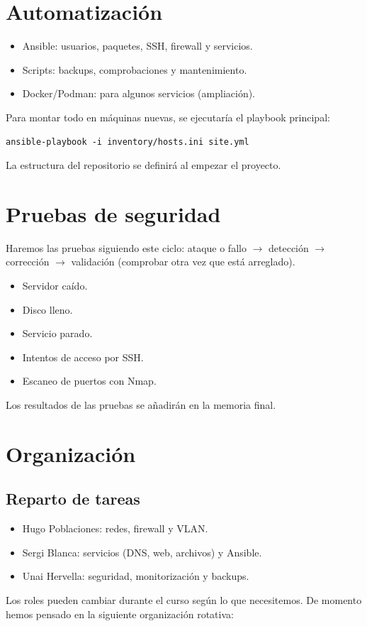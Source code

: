 \documentclass[12pt,a4paper]{article}
\begin{document}
\section{Automatización}
\begin{itemize}
\item Ansible: usuarios, paquetes, SSH, firewall y servicios.
\item Scripts: backups, comprobaciones y mantenimiento.
\item Docker/Podman: para algunos servicios (ampliación).
\end{itemize}
Para montar todo en máquinas nuevas, se ejecutaría el playbook principal:
\begin{verbatim}
ansible-playbook -i inventory/hosts.ini site.yml
\end{verbatim}
La estructura del repositorio se definirá al empezar el proyecto.

\section{Pruebas de seguridad}
Haremos las pruebas siguiendo este ciclo: ataque o fallo $\rightarrow$ detección $\rightarrow$ corrección $\rightarrow$ validación (comprobar otra vez que está arreglado).
\begin{itemize}
\item Servidor caído.
\item Disco lleno.
\item Servicio parado.
\item Intentos de acceso por SSH.
\item Escaneo de puertos con Nmap.
\end{itemize}
Los resultados de las pruebas se añadirán en la memoria final.

\section{Organización}
\subsection{Reparto de tareas}
\begin{itemize}
\item Hugo Poblaciones: redes, firewall y VLAN.
\item Sergi Blanca: servicios (DNS, web, archivos) y Ansible.
\item Unai Hervella: seguridad, monitorización y backups.
\end{itemize}
Los roles pueden cambiar durante el curso según lo que necesitemos. De momento hemos pensado en la siguiente organización rotativa:
\end{document}
